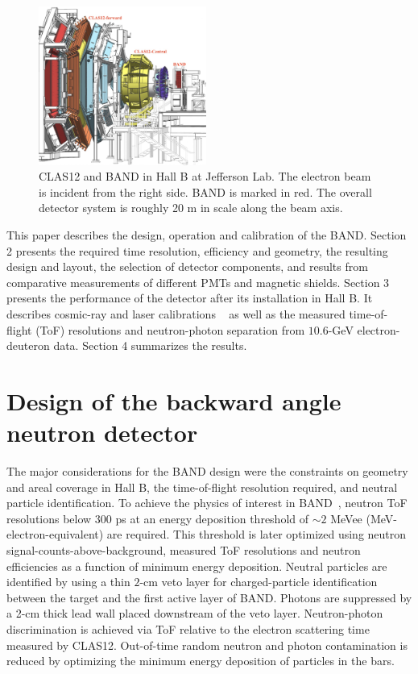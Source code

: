 \documentclass[review,number,sort&compress]{elsarticle}
\begin{document}
\begin{figure}[t!]
	\centering
	\includegraphics[width=0.49\textwidth]{BandInClas.jpg}
        \caption{CLAS12 and BAND in Hall B at Jefferson Lab. The
          electron beam is incident from the right side. BAND is
          marked in red. The overall detector system is roughly 20
          \si{\meter} in scale along the beam axis. }
		\label{fig:clas12band}
\end{figure}
This paper describes the design, operation and calibration of the BAND.
Section 2 presents the required time resolution, efficiency and
geometry, the resulting design and layout, the selection of detector
components, and results from comparative measurements of different
PMTs and magnetic shields. Section 3 presents the performance of the
detector after its installation in Hall B. It describes cosmic-ray and
laser calibrations ~\cite{band-laser} as well as the measured
time-of-flight (ToF) resolutions and neutron-photon separation from
$10.6$-\si{\GeV} electron-deuteron data. Section 4 summarizes the
results.




\section{Design of the backward angle neutron detector}
The major considerations for the BAND design were the constraints on
geometry and areal coverage in Hall B, the time-of-flight resolution
required, and neutral particle identification.  To achieve the physics
of interest in BAND~\cite{band-proposal}, neutron ToF
resolutions below $300$ \si{\pico\second} at an energy deposition
threshold of $\sim 2$ MeVee (MeV-electron-equivalent) are required. 
This threshold is later optimized using neutron signal-counts-above-background,
measured ToF resolutions and neutron efficiencies as a function of minimum energy deposition.
Neutral particles are
identified by using a thin $2$-\si{\centi\meter} veto layer for
charged-particle identification between the target and the first
active layer of BAND. Photons are suppressed by a 2-\si{\centi\meter}
thick lead wall placed downstream of the veto layer. Neutron-photon
discrimination is achieved via ToF relative to the electron scattering
time measured by CLAS12. Out-of-time random neutron and photon
contamination is reduced by optimizing the minimum energy deposition of particles in the bars.
\end{document}
